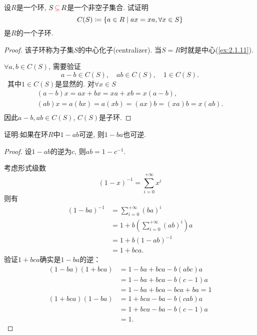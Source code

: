 \begin{problem}
    设$R$是一个环, $S \,\textcolor{red}{\subseteq}\, R$是一个非空子集合. 试证明
\[
    C(S) \mathrel{\coloneqq} \{a \in R \mid ax = xa, \forall x \in S \}
\]
是$R$的一个子环.
\end{problem}

\begin{proof}
    该子环称为子集$S$的中心化子(centralizer). 当$S = R$时就是中心(\ref{ex:2.1.11}).

    $\forall a, b \in C(S)$, 需要验证
    \[
        a - b \in C(S), \quad ab \in C(S), \quad 1 \in C(S).
    \]\
    其中$1 \in C(S)$是显然的.
    对$\forall x \in S$
    \[
    \begin{gathered}
        (a - b)x = ax + bx = xa + xb = x(a - b),\\
        (ab)x = a(bx) = a(xb) = (ax)b = (xa)b = x(ab).\\
    \end{gathered}
    \]
    因此$a - b, ab \in C(S)$, $C(S)$是子环.
\end{proof}

\begin{problem}\label{ex:1.2.5}
    证明:如果在环$R$中$1 - ab$可逆, 则$1 - ba$也可逆.
\end{problem}

\begin{proof}
    设$1 - ab$的逆为$c$, 则$ab = 1 - c^{-1}$.

    考虑形式级数
    \[
        (1 - x)^{-1} = \sum_{i = 0}^{+\infty} x^i
    \]
    则有
    \[
    \begin{aligned}
        (1 - ba)^{-1} &= \sum_{i = 0}^{+\infty} (ba)^i\\
        &= 1 + b\left(\sum_{i = 0}^{+\infty} (ab)^i\right)a\\
        &= 1 + b(1 - ab)^{-1}\\
        &= 1 + bca.
    \end{aligned} 
    \]
    验证$1 + bca$确实是$1 - ba$的逆：
    \[
    \begin{aligned}
        (1 - ba)(1 + bca) &= 1 - ba + bca - b(abc)a\\
        &= 1 - ba + bca -b(c - 1)a\\
        &= 1 - ba + bca -bca + ba = 1\\
        (1 + bca)(1 - ba) &= 1 + bca - ba - b(cab)a\\
        &= 1 + bca - ba - b(c - 1)a\\
        &= 1.
    \end{aligned}
    \]
\end{proof}


